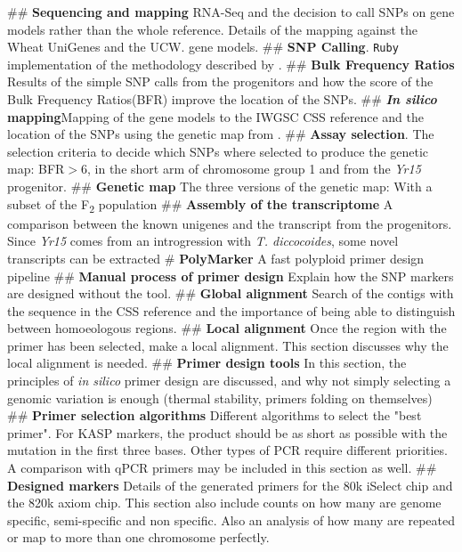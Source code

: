 \documentclass[10pt,a4paper]{article}
\begin{document}
\begin{easylist}
	## \textbf{Sequencing and mapping} RNA-Seq and the decision to call SNPs on gene models rather than the whole reference.  Details of the mapping against the Wheat UniGenes \cite{PontiusJUWagnerL2002} and the UCW. \cite{Krasileva2013} gene models.  
	## \textbf{SNP Calling}. \verb|Ruby| implementation of the methodology described by \citet{Trick2012}. 
	## \textbf{Bulk Frequency Ratios} Results of the simple SNP calls from the progenitors and how the score of the Bulk Frequency Ratios(BFR) improve the location of the SNPs. 
	## \textbf{\textit{In silico} mapping}Mapping of the gene models to the IWGSC CSS \cite{Mayer2014} reference and the location of the SNPs using the genetic map from \citet{Wang2014}.
	## \textbf{Assay selection}. The selection criteria to decide which SNPs where selected to produce the genetic map: BFR$>$6, in the short arm of chromosome group 1 and from the \textit{Yr15} progenitor.
	## \textbf{Genetic map} The three versions of the genetic map: With a subset of the F\textsubscript{2} population
	## \textbf{Assembly of the transcriptome} A comparison between the known unigenes and the transcript from the progenitors. Since \textit{Yr15} comes from an introgression with \textit{T. diccocoides}, some novel transcripts can be extracted
	# \textbf{PolyMarker} A fast polyploid primer design pipeline
	## \textbf{Manual process of primer design} Explain how the SNP markers are designed without the tool. 
	## \textbf{Global alignment} Search of the contigs with the sequence in the CSS reference and the importance of being able to distinguish between homoeologous regions. 
	## \textbf{Local alignment} Once the region with the primer has been selected, make a local alignment. This section discusses why the local alignment is needed. 
	## \textbf{Primer design tools} In this section, the principles of \textit{in silico} primer design are discussed, and why not simply selecting a genomic variation is enough (thermal stability, primers folding on themselves)
	## \textbf{Primer selection algorithms} Different algorithms to select the "best primer". For KASP markers, the product should be as short as possible with the mutation in the first three bases. Other types of PCR require different priorities. A comparison with qPCR primers may be included in this section as well. 
	## \textbf{Designed markers} Details of the generated primers for the 80k iSelect chip and the 820k axiom chip. This section also include counts on how many are genome specific, semi-specific and non specific. Also an analysis of how many are repeated or map to more than one chromosome perfectly.

\end{easylist}
\end{document}
